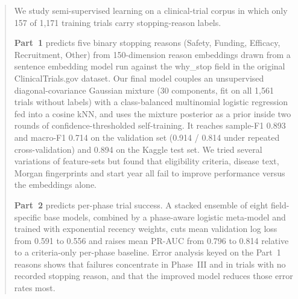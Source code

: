 \begin{abstract}
We study semi-supervised learning on a clinical-trial corpus in which only 157 of
1,171 training trials carry stopping-reason labels. 

\textbf{Part~1} predicts five
binary stopping reasons (Safety, Funding, Efficacy, Recruitment, Other) from 150-dimension
reason embeddings drawn from a sentence embedding model run against the why\_stop field in the original ClinicalTrials.gov dataset. Our final model couples an unsupervised diagonal-covariance
Gaussian mixture (30 components, fit on all 1,561 trials without labels) with a
class-balanced multinomial logistic regression fed into a cosine kNN, and
uses the mixture posterior as a prior inside two rounds of confidence-thresholded
self-training. It reaches sample-F1 0.893 and macro-F1 0.714 on the validation set
(0.914 / 0.814 under repeated cross-validation) and 0.894 on the Kaggle test set.
We tried several variations of feature-sets but found that eligibility criteria, disease text, Morgan fingerprints and
start year all fail to improve performance versus the embeddings alone.

\textbf{Part~2} predicts
per-phase trial success. A stacked ensemble of eight field-specific base models,
combined by a phase-aware logistic meta-model and trained with exponential recency
weights, cuts mean validation log loss from 0.591 to 0.556 and raises mean PR-AUC
from 0.796 to 0.814 relative to a criteria-only per-phase baseline. Error analysis
keyed on the Part~1 reasons shows that failures concentrate in Phase~III and in
trials with no recorded stopping reason, and that the improved model reduces those
error rates most.
\end{abstract}
